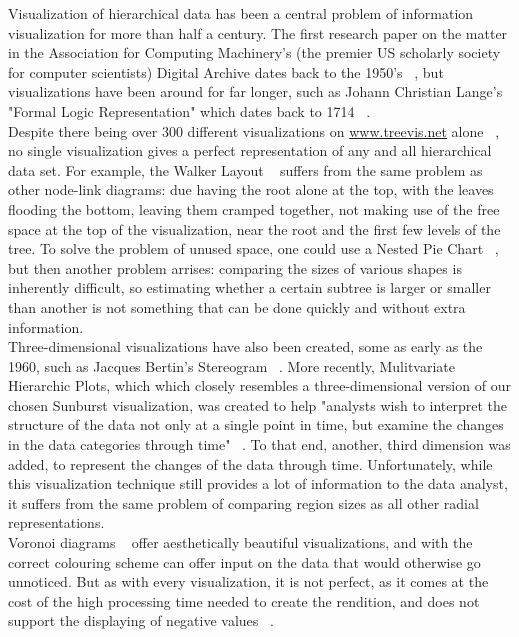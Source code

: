 \documentclass[journal, 9pt]{vgtc}                %
\begin{document}
Visualization of hierarchical data has been a central problem of information visualization for more than half a century. The first research paper on the matter in the Association for Computing Machinery's
(the premier US scholarly society for computer scientists) Digital Archive dates back to the 1950's ~\cite{ACM}, but visualizations have been around for far longer, such as Johann Christian Lange's "Formal
Logic Representation" which dates back to 1714 ~\cite{Baron1969}.\\
Despite there being over 300 different visualizations on \url{www.treevis.net} alone ~\cite{treevis}, no single visualization gives a perfect representation of any and all hierarchical data set. For example,
the Walker Layout ~\cite{Walker1990} suffers from the same problem as other node-link diagrams: due having the root alone at the top, with the leaves flooding
the bottom, leaving them cramped together, not making use of the free space at the top of the visualization, near the root and the first few levels of the tree. To solve the problem of unused space, one
could use a Nested Pie Chart ~\cite{Sukla2005}, but then another problem arrises: comparing the sizes of various shapes is inherently difficult, so estimating whether a certain subtree is larger or smaller
than another is not something that can be done quickly and without extra information.\\
Three-dimensional visualizations have also been created, some as early as the 1960, such as Jacques Bertin's Stereogram ~\cite{Bertin1967}. More recently, Mulitvariate Hierarchic Plots, which
which closely resembles a three-dimensional version of our chosen Sunburst visualization, was created to help "analysts wish to interpret the structure of the data not only at a single point in
time, but examine the changes in the data categories through time" ~\cite{Tekusova2008}. To that end, another, third dimension was added, to represent the changes of the data through
time. Unfortunately, while this visualization technique still provides a lot of information to the data analyst, it suffers from the same problem of comparing region sizes as all other radial
representations.\\
Voronoi diagrams ~\cite{Balzer2005} offer aesthetically beautiful visualizations, and with the correct colouring scheme can offer input on the data that would 
otherwise go unnoticed.  But as with every visualization, it is not perfect, as it comes at the cost of the high processing time needed to create the rendition,
and does not support the displaying of negative values ~\cite{qlik}.\\
\\
\end{document}

